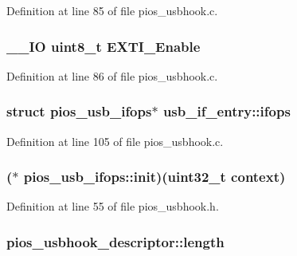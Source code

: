 Definition at line 85 of file pios\-\_\-usbhook.\-c.

\hypertarget{group___p_i_o_s___u_s_b_h_o_o_k_ga80e4a20c4f7576283232cda440c47694}{
\subsubsection[{E\-X\-T\-I\-\_\-\-Enable}]{\setlength{\rightskip}{0pt plus 5cm}\-\_\-\-\_\-\-I\-O {\bf uint8\-\_\-t} E\-X\-T\-I\-\_\-\-Enable}}\label{group___p_i_o_s___u_s_b_h_o_o_k_ga80e4a20c4f7576283232cda440c47694}


Definition at line 86 of file pios\-\_\-usbhook.\-c.

\hypertarget{group___p_i_o_s___u_s_b_h_o_o_k_ga8c6a8d1a868734fd250c8af665a54c3c}{
\subsubsection[{ifops}]{\setlength{\rightskip}{0pt plus 5cm}struct {\bf pios\-\_\-usb\-\_\-ifops}$\ast$ usb\-\_\-if\-\_\-entry\-::ifops}}\label{group___p_i_o_s___u_s_b_h_o_o_k_ga8c6a8d1a868734fd250c8af665a54c3c}


Definition at line 105 of file pios\-\_\-usbhook.\-c.

\hypertarget{group___p_i_o_s___u_s_b_h_o_o_k_ga08614658e728cfb81cb4091e3e210624}{
\subsubsection[{init}]{($\ast$ pios\-\_\-usb\-\_\-ifops\-::init)({\bf uint32\-\_\-t} context)}}\label{group___p_i_o_s___u_s_b_h_o_o_k_ga08614658e728cfb81cb4091e3e210624}


Definition at line 55 of file pios\-\_\-usbhook.\-h.

\hypertarget{group___p_i_o_s___u_s_b_h_o_o_k_ga9cc49b35b49236ac74e747d179a3650f}{
\subsubsection[{length}]{ pios\-\_\-usbhook\-\_\-descriptor\-::length}}\label{group___p_i_o_s___u_s_b_h_o_o_k_ga9cc49b35b49236ac74e747d179a3650f}



